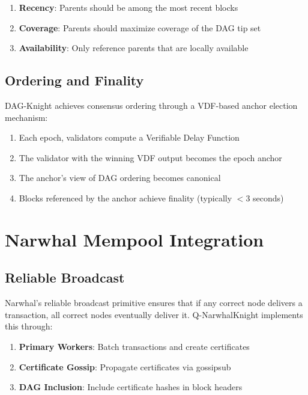 \documentclass[11pt,a4paper]{article}
\begin{document}
\begin{enumerate}
    \item \textbf{Recency}: Parents should be among the most recent blocks
    \item \textbf{Coverage}: Parents should maximize coverage of the DAG tip set
    \item \textbf{Availability}: Only reference parents that are locally available
\end{enumerate}

\subsection{Ordering and Finality}

DAG-Knight achieves consensus ordering through a VDF-based anchor election mechanism:

\begin{enumerate}
    \item Each epoch, validators compute a Verifiable Delay Function
    \item The validator with the winning VDF output becomes the epoch anchor
    \item The anchor's view of DAG ordering becomes canonical
    \item Blocks referenced by the anchor achieve finality (typically $< 3$ seconds)
\end{enumerate}

\section{Narwhal Mempool Integration}

\subsection{Reliable Broadcast}

Narwhal's reliable broadcast primitive ensures that if any correct node delivers a transaction, all correct nodes eventually deliver it. Q-NarwhalKnight implements this through:

\begin{enumerate}
    \item \textbf{Primary Workers}: Batch transactions and create certificates
    \item \textbf{Certificate Gossip}: Propagate certificates via gossipsub
    \item \textbf{DAG Inclusion}: Include certificate hashes in block headers
\end{enumerate}
\end{document}
